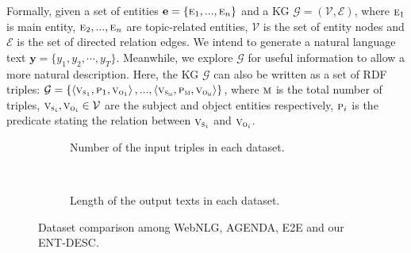 \documentclass[11pt,a4paper]{article}
\renewcommand{\vec}[1]{\mathbf{#1}} \usepackage{color, colortbl}
\renewcommand{\vec}[1]{\mathbf{#1}}
\begin{document}
Formally, given a set of entities $\vec{e} = \left \{ \textsc{e}_{1}, ..., \textsc{e}_{n} \right \}$ and a KG $\mathcal{G} = \left ( \mathcal{V}, \mathcal{E}\right )$, where $\textsc{e}_{1}$ is main entity, $\textsc{e}_{2}, ..., \textsc{e}_{n}$ are topic-related entities, $\mathcal{V}$ is the set of entity nodes and $\mathcal{E}$ is the set of directed relation edges.
We intend to generate a natural language text $\vec{y} = \{y_1, y_2,\cdots,y_{T}\}$.
Meanwhile, we explore $\mathcal{G}$ for useful information to allow a more natural description. Here, the KG $\mathcal{G}$ can also be written as a set of RDF triples: $\mathcal{G} = \left \{ \left < \textsc{v}_{\textsc{s}_{1}}, \textsc{p}_{1}, \textsc{v}_{\textsc{o}_{1}} \right >, ..., \left < \textsc{v}_{\textsc{s}_{\textsc{m}}}, \textsc{p}_{\textsc{m}}, \textsc{v}_{\textsc{o}_{\textsc{m}}} \right > \right \}$, where $\textsc{m}$ is the total number of triples, $\textsc{v}_{\textsc{s}_{i}}, \textsc{v}_{\textsc{o}_{i}} \in \mathcal{V}$ are the subject and object entities respectively, $\textsc{p}_{i}$ is the predicate stating the relation between $\textsc{v}_{\textsc{s}_{i}}$ and $\textsc{v}_{\textsc{o}_{i}}$.

\begin{table}[!t]
\centering
{}
\caption{Dataset statistics of WebNLG, AGENDA and our prepared ENT-DESC. 
\label{tb:stats_ds}}
\end{table}





\begin{figure*}[!t]
    \centering
    \begin{subfigure}[t]{0.5\textwidth}
        \centering
        \caption{Number of the input triples in each dataset.}
    \end{subfigure}~ 
    \begin{subfigure}[t]{0.5\textwidth}
        \centering
        \caption{Length of the output texts in each dataset.}
    \end{subfigure}
\caption{Dataset comparison among WebNLG, AGENDA, E2E and our ENT-DESC.}
\label{fig:dataset_compa}
\end{figure*}
\end{document}
